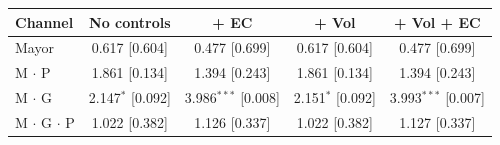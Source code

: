 \begin{tabular}{@{}lcccc@{}}
\toprule
Channel & No controls & + EC & + Vol & + Vol + EC \\
\midrule
Mayor & 0.617 [0.604] & 0.477 [0.699] & 0.617 [0.604] & 0.477 [0.699] \\
M $\cdot$ P & 1.861 [0.134] & 1.394 [0.243] & 1.861 [0.134] & 1.394 [0.243] \\
M $\cdot$ G & 2.147$^{*}$ [0.092] & 3.986$^{***}$ [0.008] & 2.151$^{*}$ [0.092] & 3.993$^{***}$ [0.007] \\
M $\cdot$ G $\cdot$ P & 1.022 [0.382] & 1.126 [0.337] & 1.022 [0.382] & 1.127 [0.337] \\
\bottomrule
\end{tabular}
